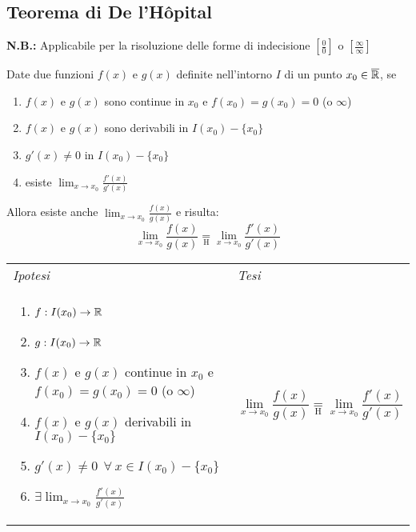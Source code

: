     \subsection{Teorema di De l'Hôpital}\label{subsection: de l'Hopital}
    \textbf{N.B.:} Applicabile per la risoluzione delle forme di indecisione $\left[\frac{0}{0}\right]$ o $\left[\frac{\infty}{\infty}\right]$
        \begin{shadedTheorem}[De l'Hôpital]
            Date due funzioni $f(x)$ e $g(x)$ definite nell'intorno $I$ di un punto $x_0\in \overline{\mathbb{R}}$, se
            \begin{enumerate}
                \item $f(x)$ e $g(x)$ sono continue in $x_0$ e $f(x_0)=g(x_0)=0$ (o $\infty$)
                \item $f(x)$ e $g(x)$ sono derivabili in $I(x_0)-\{x_0\}$ 
                \item $g'(x)\neq 0$ in $I(x_0)-\{x_0\}$
                \item esiste $\lim_{x\to x_0}\frac{f'(x)}{g'(x)}$
            \end{enumerate}
            Allora esiste anche $\lim_{x\to x_0}    \frac{f(x)}{g(x)}$ e risulta:
            \[\lim_{x\to x_0}\frac{f(x)}{g(x)}\underset{\mathrm{H}}{=}\lim_{x\to x_0}\frac{f'(x)}{g'(x)}\]
        \end{shadedTheorem}
        \begin{tabular}{m{}m{}}
            \textit{Ipotesi} & \textit{Tesi}  \\
            \begin{enumerate}
                \item $f: I(x_0)\to \mathbb{R}$
                \item $g: I(x_0)\to \mathbb{R}$
                \item $f(x)$ e $g(x)$ continue in $x_0$ e $f(x_0)=g(x_0)=0$ (o $\infty$)
                \item $f(x)$ e $g(x)$ derivabili in $I(x_0)-\{x_0\}$ 
                \item $g'(x)\neq 0 ~~\forall~ x \in I(x_0)-\{x_0\}$
                \item $\exists \lim_{x\to x_0}\frac{f'(x)}{g'(x)}$
            \end{enumerate} & \[\lim_{x\to x_0}\frac{f(x)}{g(x)}\underset{\mathrm{H}}{=}\lim_{x\to x_0}\frac{f'(x)}{g'(x)}\]
        \end{tabular}
